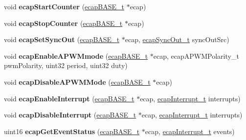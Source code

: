 \begin{DoxyCompactItemize}
void {\bfseries ecap\+Start\+Counter} (\mbox{\hyperlink{reg__ecap_8h_a8ca3ed15315b354b71b837ed4b6685a9}{ecap\+B\+A\+S\+E\+\_\+t}} $\ast$ecap)
\item 
\mbox{\label{group__eCAP_ga77b9ddc1101443e46831a5d5d05d5d02}} 
void {\bfseries ecap\+Stop\+Counter} (\mbox{\hyperlink{reg__ecap_8h_a8ca3ed15315b354b71b837ed4b6685a9}{ecap\+B\+A\+S\+E\+\_\+t}} $\ast$ecap)
\item 
\mbox{\label{group__eCAP_gab47aae10ce2a2805095ed790e81c61dc}} 
void {\bfseries ecap\+Set\+Sync\+Out} (\mbox{\hyperlink{reg__ecap_8h_a8ca3ed15315b354b71b837ed4b6685a9}{ecap\+B\+A\+S\+E\+\_\+t}} $\ast$ecap, \mbox{\hyperlink{ecap_8h_af80b1d32ef37bc1abed84b2c856a9fdf}{ecap\+Sync\+Out\+\_\+t}} sync\+Out\+Src)
\item 
\mbox{\label{group__eCAP_ga448861a269b3ef7fb1c052aff9166de9}} 
void {\bfseries ecap\+Enable\+A\+P\+W\+Mmode} (\mbox{\hyperlink{reg__ecap_8h_a8ca3ed15315b354b71b837ed4b6685a9}{ecap\+B\+A\+S\+E\+\_\+t}} $\ast$ecap, ecap\+A\+P\+W\+M\+Polarity\+\_\+t pwm\+Polarity, uint32 period, uint32 duty)
\item 
\mbox{\label{group__eCAP_gaee1bcff06c263f80087bbfb4022fcde6}} 
void {\bfseries ecap\+Disable\+A\+P\+W\+M\+Mode} (\mbox{\hyperlink{reg__ecap_8h_a8ca3ed15315b354b71b837ed4b6685a9}{ecap\+B\+A\+S\+E\+\_\+t}} $\ast$ecap)
\item 
\mbox{\label{group__eCAP_ga7ee1f84b1f75088368e708c213f1e6b2}} 
void {\bfseries ecap\+Enable\+Interrupt} (\mbox{\hyperlink{reg__ecap_8h_a8ca3ed15315b354b71b837ed4b6685a9}{ecap\+B\+A\+S\+E\+\_\+t}} $\ast$ecap, \mbox{\hyperlink{ecap_8h_a5432cd14eb279967751b607c755e8329}{ecap\+Interrupt\+\_\+t}} interrupts)
\item 
\mbox{\label{group__eCAP_ga9e03fd7b9b62467e3fe00168050a2e34}} 
void {\bfseries ecap\+Disable\+Interrupt} (\mbox{\hyperlink{reg__ecap_8h_a8ca3ed15315b354b71b837ed4b6685a9}{ecap\+B\+A\+S\+E\+\_\+t}} $\ast$ecap, \mbox{\hyperlink{ecap_8h_a5432cd14eb279967751b607c755e8329}{ecap\+Interrupt\+\_\+t}} interrupts)
\item 
\mbox{\label{group__eCAP_ga7f727619488b4dbfdf4530b668d015ac}} 
uint16 {\bfseries ecap\+Get\+Event\+Status} (\mbox{\hyperlink{reg__ecap_8h_a8ca3ed15315b354b71b837ed4b6685a9}{ecap\+B\+A\+S\+E\+\_\+t}} $\ast$ecap, \mbox{\hyperlink{ecap_8h_a5432cd14eb279967751b607c755e8329}{ecap\+Interrupt\+\_\+t}} events)

\end{DoxyCompactItemize}
